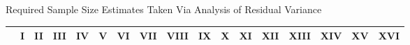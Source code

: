 \documentclass[12pt]{article}
\begin{document}
\begin{landscape}
\begin{center}
\Large{Required Sample Size Estimates Taken Via Analysis of Residual Variance}
\end{center}
\begin{table}[h]
\small\addtolength{\tabcolsep}{-1pt}
\begin{tabular}{c|cccccccccccccccc}
                                                                                         & \textbf{I}                                               & \textbf{II}                                              & \textbf{III}                                             & \textbf{IV}                                               & \textbf{V}                                              & \textbf{VI}                                              & \textbf{VII}                                            & \textbf{VIII}                                          & \textbf{IX}                                              & \textbf{X}                                               & \textbf{XI}                                              & \textbf{XII}                                           & \textbf{XIII}                                           & \textbf{XIV}                                            & \textbf{XV}                                             & \textbf{XVI}                                             \\ \hline

\end{tabular}
\end{table}
\end{landscape}
\end{document}
